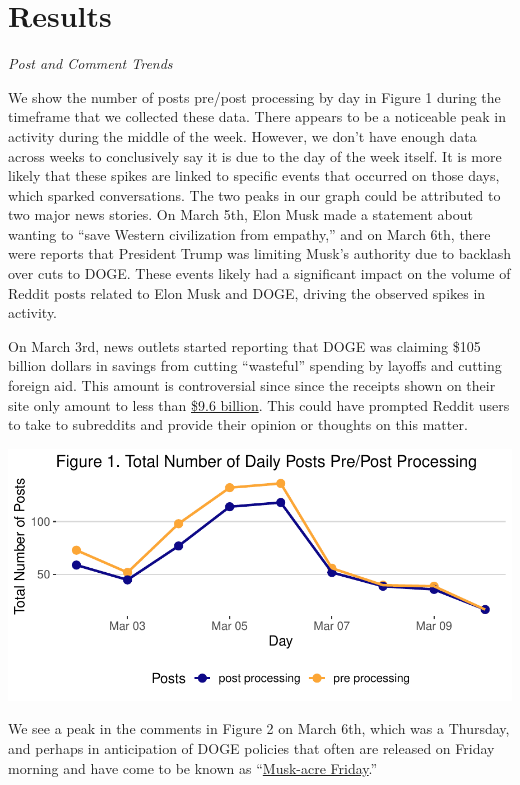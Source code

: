 \documentclass[
  12pt]{article}
\begin{document}
\section{Results}\label{results}

\emph{Post and Comment Trends}

We show the number of posts pre/post processing by day in Figure 1
during the timeframe that we collected these data. There appears to be a
noticeable peak in activity during the middle of the week. However, we
don't have enough data across weeks to conclusively say it is due to the
day of the week itself. It is more likely that these spikes are linked
to specific events that occurred on those days, which sparked
conversations. The two peaks in our graph could be attributed to two
major news stories. On March 5th, Elon Musk made a statement about
wanting to ``save Western civilization from empathy,'' and on March 6th,
there were reports that President Trump was limiting Musk's authority
due to backlash over cuts to DOGE. These events likely had a significant
impact on the volume of Reddit posts related to Elon Musk and DOGE,
driving the observed spikes in activity.

On March 3rd, news outlets started reporting that DOGE was claiming
\$105 billion dollars in savings from cutting ``wasteful'' spending by
layoffs and cutting foreign aid. This amount is controversial since
since the receipts shown on their site only amount to less than
\href{https://abcnews.go.com/US/doge-website-now-saved-105-billion-backtracked-earlier/story?id=119408347}{\$9.6
billion}. This could have prompted Reddit users to take to subreddits
and provide their opinion or thoughts on this matter.

\includegraphics{paper_files/figure-pdf/unnamed-chunk-3-1.pdf}

We see a peak in the comments in Figure 2 on March 6th, which was a
Thursday, and perhaps in anticipation of DOGE policies that often are
released on Friday morning and have come to be known as
``\href{https://smotus.substack.com/p/friday-night-musk-acre}{Musk-acre
Friday}.''
\end{document}
